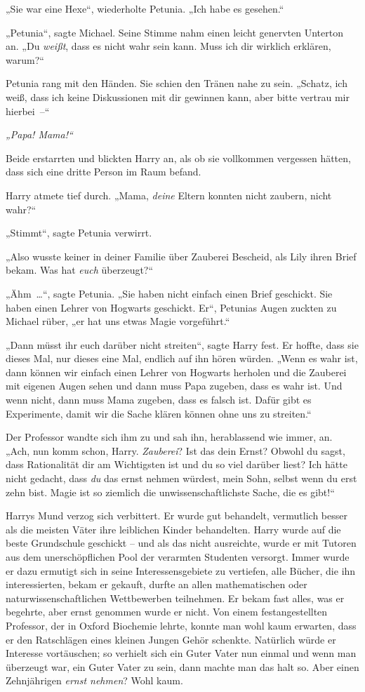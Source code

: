 „Sie war eine Hexe“, wiederholte Petunia. „Ich habe es gesehen.“

„Petunia“, sagte Michael. Seine Stimme nahm einen leicht genervten Unterton an. „Du \emph{weißt}, dass es nicht wahr sein kann. Muss ich dir wirklich erklären, warum?“

Petunia rang mit den Händen. Sie schien den Tränen nahe zu sein. „Schatz, ich weiß, dass ich keine Diskussionen mit dir gewinnen kann, aber bitte vertrau mir hierbei –“

\emph{„Papa! Mama!“}

Beide erstarrten und blickten Harry an, als ob sie vollkommen vergessen hätten, dass sich eine dritte Person im Raum befand.

Harry atmete tief durch. „Mama, \emph{deine} Eltern konnten nicht zaubern, nicht wahr?“

„Stimmt“, sagte Petunia verwirrt.

„Also wusste keiner in deiner Familie über Zauberei Bescheid, als Lily ihren Brief bekam. Was hat \emph{euch} überzeugt?“

„Ähm …“, sagte Petunia. „Sie haben nicht einfach einen Brief geschickt. Sie haben einen Lehrer von Hogwarts geschickt. Er“, Petunias Augen zuckten zu Michael rüber, „er hat uns etwas Magie vorgeführt.“

„Dann müsst ihr euch darüber nicht streiten“, sagte Harry fest. Er hoffte, dass sie dieses Mal, nur dieses eine Mal, endlich auf ihn hören würden. „Wenn es wahr ist, dann können wir einfach einen Lehrer von Hogwarts herholen und die Zauberei mit eigenen Augen sehen und dann muss Papa zugeben, dass es wahr ist. Und wenn nicht, dann muss Mama zugeben, dass es falsch ist. Dafür gibt es Experimente, damit wir die Sache klären können ohne uns zu streiten.“

Der Professor wandte sich ihm zu und sah ihn, herablassend wie immer, an. „Ach, nun komm schon, Harry. \emph{Zauberei}? Ist das dein Ernst? Obwohl du sagst, dass Rationalität dir am Wichtigsten ist und du so viel darüber liest? Ich hätte nicht gedacht, dass \emph{du} das ernst nehmen würdest, mein Sohn, selbst wenn du erst zehn bist. Magie ist so ziemlich die unwissenschaftlichste Sache, die es gibt!“

Harrys Mund verzog sich verbittert. Er wurde gut behandelt, vermutlich besser als die meisten Väter ihre leiblichen Kinder behandelten. Harry wurde auf die beste Grundschule geschickt – und als das nicht ausreichte, wurde er mit Tutoren aus dem unerschöpflichen Pool der verarmten Studenten versorgt. Immer wurde er dazu ermutigt sich in seine Interessensgebiete zu vertiefen, alle Bücher, die ihn interessierten, bekam er gekauft, durfte an allen mathematischen oder naturwissenschaftlichen Wettbewerben teilnehmen. Er bekam fast alles, was er begehrte, aber ernst genommen wurde er nicht. Von einem festangestellten Professor, der in Oxford Biochemie lehrte, konnte man wohl kaum erwarten, dass er den Ratschlägen eines kleinen Jungen Gehör schenkte. Natürlich würde er Interesse vortäuschen; so verhielt sich ein Guter Vater nun einmal und wenn man überzeugt war, ein Guter Vater zu sein, dann machte man das halt so. Aber einen Zehnjährigen \emph{ernst nehmen}? Wohl kaum.

